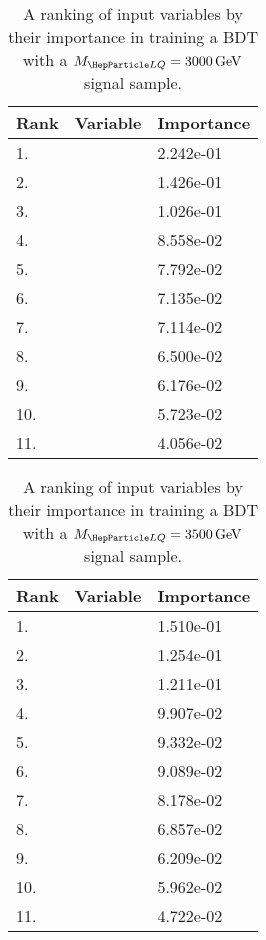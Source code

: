 \begin{table}[H]
	\caption{A ranking of input variables by their importance in training a BDT with a $\MLQ = \SI{3000}{GeV}$ signal sample.}
	\begin{center}
		\begin{tabular}{lll} \hline \hline
			Rank & Variable & Importance  \\ \hline
			1. & \DRof{\PmuOne+\PmuTwo}{\PjOne} & 2.242e-01 \\
			2. & \MujTwo & 1.426e-01 \\
			3. & \MujOne & 1.026e-01 \\
			4. & \Muujj & 8.558e-02 \\
			5. & \ptof{\PjTwo} & 7.792e-02 \\
			6. & \ST & 7.135e-02 \\
			7. & \Muu & 7.114e-02 \\
			8. & \ptof{\PmuTwo} & 6.500e-02 \\
			9. & \ptof{\PjOne} & 6.176e-02 \\
			10. & \ptof{\PmuOne} & 5.723e-02 \\
			11. & \MET & 4.056e-02 \\ \hline \hline
		\end{tabular}
		\label{tab:bdtRank3000}
	\end{center}
\end{table}

\begin{table}[H]
	\caption{A ranking of input variables by their importance in training a BDT with a $\MLQ = \SI{3500}{GeV}$ signal sample.}
	\begin{center}
		\begin{tabular}{lll} \hline \hline
			Rank & Variable & Importance  \\ \hline
			1. & \DRof{\PmuOne+\PmuTwo}{\PjOne} & 1.510e-01 \\
			2. & \ptof{\PjTwo} & 1.254e-01 \\
			3. & \MujTwo & 1.211e-01 \\
			4. & \MujOne & 9.907e-02 \\
			5. & \Muujj & 9.332e-02 \\
			6. & \ptof{\PjOne} & 9.089e-02 \\
			7. & \ST & 8.178e-02 \\
			8. & \ptof{\PmuOne} & 6.857e-02 \\
			9. & \ptof{\PmuTwo} & 6.209e-02 \\
			10. & \Muu & 5.962e-02 \\
			11. & \MET & 4.722e-02 \\ \hline \hline
		\end{tabular}
		\label{tab:bdtRank3500}
	\end{center}
\end{table}

